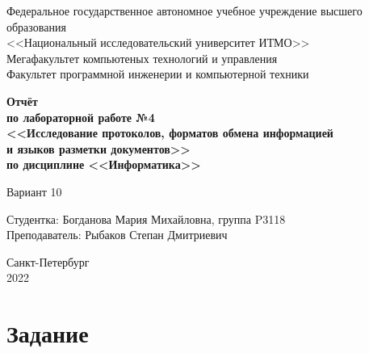 \documentclass[12pt]{article}
\begin{document}
\setcounter{page}{0}
\thispagestyle{empty}

\begin{center}
    Федеральное государственное автономное учебное учреждение высшего образования\\
    <<Национальный исследовательский университет ИТМО>>\\
\vspace{0.5cm}
    Мегафакультет компьютеных технологий и управления\\
    Факультет программной инженерии и компьютерной техники
\end{center}

\vspace{3cm}

\begin{center}
\Large
\textbf{
    Отчёт\\
    по лабораторной работе №4\\
    <<Исследование протоколов, форматов обмена информацией\\
    и языков разметки документов>>\\
    по дисциплине <<Информатика>>
}
\end{center}

\begin{center}
\large
    Вариант 10
\end{center}

\vspace{6cm}

\begin{flushright}
    Студентка: Богданова Мария Михайловна, группа P3118\\
    Преподаватель: Рыбаков Степан Дмитриевич
\end{flushright}

\vspace{6cm}

\begin{center}
    Санкт-Петербург\\
    2022
\end{center}

\newpage

\tableofcontents

\newpage

\section{Задание}
\end{document}
